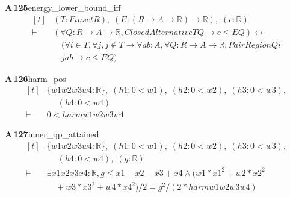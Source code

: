 \documentclass[conference]{IEEEtran}
\theoremstyle{definition}
\newcommand{\lean}[1]{\textsf{\footnotesize #1}}
\begin{document}
\noindent\textbf{A\,125}\quad\lean{energy\_lower\_bound\_iff}
{\footnotesize\[ \begin{aligned}[t]
&(\mathit{T} : \mathit{Finset} \mathit{R}),\; (\mathit{E} : (\mathit{R} \to \mathit{A} \to \mathbb{R} ) \to \mathbb{R} ),\; (\mathit{c} : \mathbb{R} )\\
\vdash\;&(\forall \mathit{Q} : \mathit{R} \to \mathit{A} \to \mathbb{R} , \mathit{ClosedAlternative} \mathit{T} \mathit{Q} \to \mathit{c} \leq \mathit{E} \mathit{Q}) \leftrightarrow\\
&\quad (\forall \mathit{i} \in \mathit{T}, \forall \mathit{j}, \mathit{j} \notin \mathit{T} \to \forall \mathit{a} \mathit{b} : \mathit{A}, \forall \mathit{Q} : \mathit{R} \to \mathit{A} \to \mathbb{R} , \mathit{PairRegion} \mathit{Q} \mathit{i}\\
&\quad \mathit{j} \mathit{a} \mathit{b} \to \mathit{c} \leq \mathit{E} \mathit{Q})
\end{aligned} \]}

\noindent\textbf{A\,126}\quad\lean{harm\_pos}
{\footnotesize\[ \begin{aligned}[t]
&\{ \mathit{w1} \mathit{w2} \mathit{w3} \mathit{w4} : \mathbb{R} \},\; (\mathit{h1} : 0 < \mathit{w1}),\; (\mathit{h2} : 0 < \mathit{w2}),\; (\mathit{h3} : 0 < \mathit{w3}),\\
&\quad \; (\mathit{h4} : 0 < \mathit{w4})\\
\vdash\;&0 < \mathit{harm} \mathit{w1} \mathit{w2} \mathit{w3} \mathit{w4}
\end{aligned} \]}

\noindent\textbf{A\,127}\quad\lean{inner\_qp\_attained}
{\footnotesize\[ \begin{aligned}[t]
&\{ \mathit{w1} \mathit{w2} \mathit{w3} \mathit{w4} : \mathbb{R} \},\; (\mathit{h1} : 0 < \mathit{w1}),\; (\mathit{h2} : 0 < \mathit{w2}),\; (\mathit{h3} : 0 < \mathit{w3}),\\
&\quad \; (\mathit{h4} : 0 < \mathit{w4}),\; (\mathit{g} : \mathbb{R} )\\
\vdash\;&\exists \mathit{x1} \mathit{x2} \mathit{x3} \mathit{x4} : \mathbb{R} , \mathit{g} \leq \mathit{x1} - \mathit{x2} - \mathit{x3} + \mathit{x4} \wedge (\mathit{w1}*\mathit{x1}^{2} + \mathit{w2}*\mathit{x2}^{2}\\
&\quad + \mathit{w3}*\mathit{x3}^{2} + \mathit{w4}*\mathit{x4}^{2}) / 2 = \mathit{g} ^{2} / (2 * \mathit{harm} \mathit{w1} \mathit{w2} \mathit{w3} \mathit{w4})
\end{aligned} \]}
\end{document}
